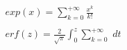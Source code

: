 \documentclass[preview]{standalone}
\begin{document}
\begin{align*}
exp(x) = \sum_{k=0}^{+\infty} { \frac{x^k}{k!} }\\ \\ erf(z) = { \frac{2}{\sqrt{\pi}} } \int_0^z { \sum_{k=0}^{+\infty} { \frac{}{} } } \, dt
\end{align*}
\end{document}
